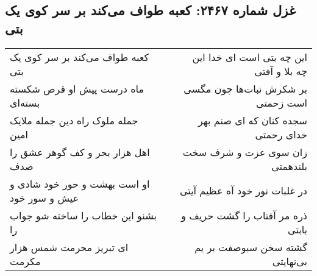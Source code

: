\begin{center}
\section*{غزل شماره ۲۴۶۷: کعبه طواف می‌کند بر سر کوی یک بتی}
\label{sec:2467}
\begin{longtable}{l p{0.5cm} r}
کعبه طواف می‌کند بر سر کوی یک بتی
&&
این چه بتی است ای خدا این چه بلا و آفتی
\\
ماه درست پیش او قرص شکسته بسته‌ای
&&
بر شکرش نبات‌ها چون مگسی است زحمتی
\\
جمله ملوک راه دین جمله ملایک امین
&&
سجده کنان که ای صنم بهر خدای رحمتی
\\
اهل هزار بحر و کف گوهر عشق را صدف
&&
زان سوی عزت و شرف سخت بلندهمتی
\\
او است بهشت و حور خود شادی و عیش و سور خود
&&
در غلبات نور خود آه عظیم آیتی
\\
بشنو این خطاب را ساخته شو جواب را
&&
ذره مر آفتاب را گشت حریف و بابتی
\\
ای تبریز محرمت شمس هزار مکرمت
&&
گشته سخن سبوصفت بر یم بی‌نهایتی
\\
\end{longtable}
\end{center}
